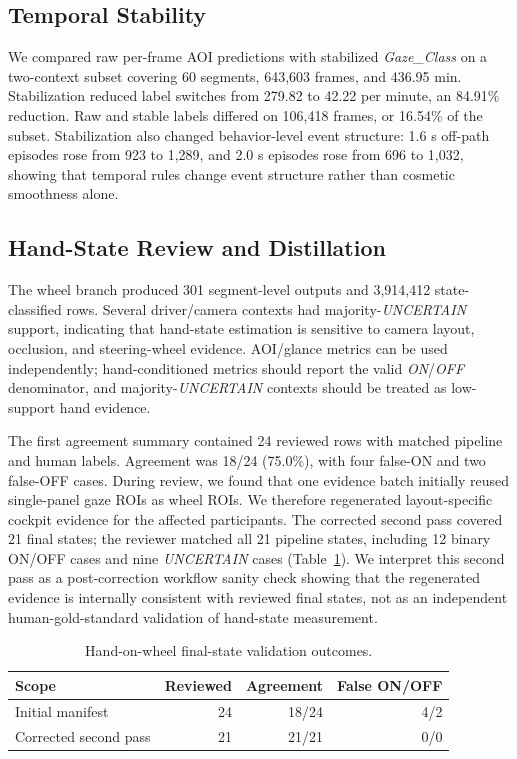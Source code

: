 \documentclass[sigconf,review,anonymous]{acmart}
\newcommand{\autouitablefont}{\footnotesize}
\begin{document}
\subsection{Temporal Stability}

We compared raw per-frame AOI predictions with stabilized
\textit{Gaze\_Class} on a two-context subset covering 60 segments,
643,603 frames, and 436.95 min. Stabilization reduced label switches from 279.82
to 42.22 per minute, an 84.91\% reduction. Raw and stable labels
differed on 106,418 frames, or 16.54\% of the subset. Stabilization also
changed behavior-level event structure: 1.6 s off-path episodes rose
from 923 to 1,289, and 2.0 s episodes rose from 696 to 1,032, showing
that temporal rules change event structure rather than cosmetic
smoothness alone.

\subsection{Hand-State Review and Distillation}

The wheel branch produced 301 segment-level outputs and 3,914,412
state-classified rows. Several driver/camera contexts had
majority-\textit{UNCERTAIN} support, indicating that hand-state
estimation is sensitive to camera layout, occlusion, and steering-wheel
evidence. AOI/glance metrics can be used independently; hand-conditioned
metrics should report the valid \textit{ON}/\textit{OFF} denominator, and
majority-\textit{UNCERTAIN} contexts should be treated as low-support hand
evidence.

The first agreement summary contained 24 reviewed rows with matched
pipeline and human labels. Agreement was 18/24 (75.0\%), with four
false-ON and two false-OFF cases. During review, we found that one
evidence batch initially reused single-panel gaze ROIs as wheel ROIs. We
therefore regenerated layout-specific cockpit evidence for the affected
participants. The corrected second pass covered 21 final states; the
reviewer matched all 21 pipeline states, including 12 binary ON/OFF cases
and nine \textit{UNCERTAIN} cases (Table~\ref{tab:wheel_second_pass}).
We interpret this second pass as a post-correction workflow sanity check
showing that the regenerated evidence is internally consistent with
reviewed final states, not as an independent human-gold-standard
validation of hand-state measurement.

\begin{table}[t]
\centering
\caption{Hand-on-wheel final-state validation outcomes.}
\label{tab:wheel_second_pass}
\autouitablefont
\begin{tabular}{lrrr}
\toprule
Scope & Reviewed & Agreement & False ON/OFF \\
\midrule
Initial manifest & 24 & 18/24 & 4/2 \\
Corrected second pass & 21 & 21/21 & 0/0 \\
\bottomrule
\end{tabular}
\end{table}
\end{document}

